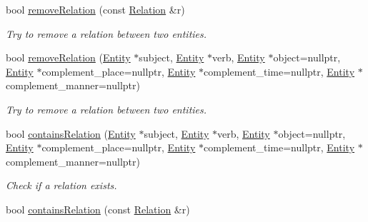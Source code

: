 \begin{DoxyCompactItemize}
bool \hyperlink{group__icubclient__clients_ac28de9ea15a53d29d9e5c794d98d0ab4}{remove\+Relation} (const \hyperlink{group__icubclient__representations_classicubclient_1_1Relation}{Relation} \&r)
\begin{DoxyCompactList}\small\item\em Try to remove a relation between two entities. \end{DoxyCompactList}\item 
bool \hyperlink{group__icubclient__clients_a6875420cc0976a941b47ca639240e896}{remove\+Relation} (\hyperlink{group__icubclient__representations_classicubclient_1_1Entity}{Entity} $\ast$subject, \hyperlink{group__icubclient__representations_classicubclient_1_1Entity}{Entity} $\ast$verb, \hyperlink{group__icubclient__representations_classicubclient_1_1Entity}{Entity} $\ast$object=nullptr, \hyperlink{group__icubclient__representations_classicubclient_1_1Entity}{Entity} $\ast$complement\+\_\+place=nullptr, \hyperlink{group__icubclient__representations_classicubclient_1_1Entity}{Entity} $\ast$complement\+\_\+time=nullptr, \hyperlink{group__icubclient__representations_classicubclient_1_1Entity}{Entity} $\ast$complement\+\_\+manner=nullptr)
\begin{DoxyCompactList}\small\item\em Try to remove a relation between two entities. \end{DoxyCompactList}\item 
bool \hyperlink{group__icubclient__clients_a8679fddd5ea40734a4da2d89ec6155c7}{contains\+Relation} (\hyperlink{group__icubclient__representations_classicubclient_1_1Entity}{Entity} $\ast$subject, \hyperlink{group__icubclient__representations_classicubclient_1_1Entity}{Entity} $\ast$verb, \hyperlink{group__icubclient__representations_classicubclient_1_1Entity}{Entity} $\ast$object=nullptr, \hyperlink{group__icubclient__representations_classicubclient_1_1Entity}{Entity} $\ast$complement\+\_\+place=nullptr, \hyperlink{group__icubclient__representations_classicubclient_1_1Entity}{Entity} $\ast$complement\+\_\+time=nullptr, \hyperlink{group__icubclient__representations_classicubclient_1_1Entity}{Entity} $\ast$complement\+\_\+manner=nullptr)
\begin{DoxyCompactList}\small\item\em Check if a relation exists. \end{DoxyCompactList}\item 
bool \hyperlink{group__icubclient__clients_af024cf7dd739214e22c176911740778a}{contains\+Relation} (const \hyperlink{group__icubclient__representations_classicubclient_1_1Relation}{Relation} \&r)

\end{DoxyCompactItemize}
